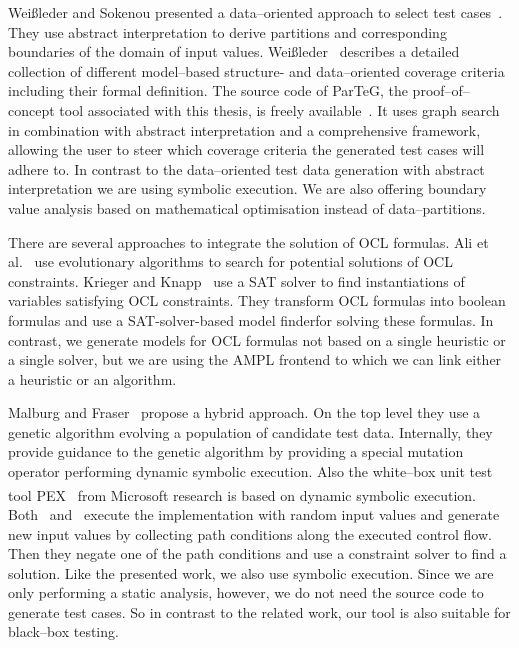 \documentclass[runningheads,a4paper]{llncs}%
\begin{document}
Wei{\ss}leder and Sokenou presented a data--oriented approach to
select test cases~\cite{weissleder2008automatic}. They use abstract
interpretation to derive partitions and corresponding boundaries of the domain of input values. 
Wei{\ss}leder~\cite{ParTeG} describes a detailed collection of
different model--based structure- and data--oriented coverage criteria including their formal definition.
The source code of ParTeG, the proof--of--concept tool associated with this thesis, is
freely available~\cite{PartegWebsite}. It uses graph search in combination with
abstract interpretation and a comprehensive framework, allowing the user to
steer which coverage criteria the generated test cases will adhere to. In
contrast to the data--oriented test data generation with abstract interpretation
we are using symbolic execution. We are also offering boundary value analysis
based on mathematical optimisation instead of data--partitions.

There are several approaches to integrate the solution of OCL formulas.
Ali et al.~\cite{ali2011search} use
evolutionary algorithms to search for potential solutions of OCL
constraints. Krieger and Knapp~\cite{krieger2008executingUnderspecifiedOCL} use a SAT solver to find
instantiations of variables satisfying OCL constraints. They 
transform OCL formulas into boolean formulas and use a SAT-solver-based model finderfor solving these formulas.
In contrast, we generate models for OCL formulas not based on a single
heuristic or a single solver, but we are using the AMPL frontend to which we can
link either a heuristic or an algorithm.

Malburg and Fraser~\cite{malburg2011combining} propose a hybrid
approach. On the top level they use a genetic algorithm evolving a population of
candidate test data. Internally, they provide guidance to the genetic algorithm
by providing a special mutation operator performing dynamic symbolic execution.
Also the white--box unit test tool PEX~\cite{pex} from
Microsoft\textsuperscript{\textregistered} research is based on dynamic symbolic
execution. Both~\cite{malburg2011combining} and~\cite{pex}
execute the implementation with random input values and generate new
input values by collecting path conditions along the executed control flow.
Then they negate one of the path conditions and use a constraint solver to find
a solution. 
Like the presented work, we also use symbolic execution.
Since we are only performing a static analysis, however, we do not need the source code to generate test cases. 
So in contrast to the related work, our tool is also suitable for black--box testing.
\end{document}
